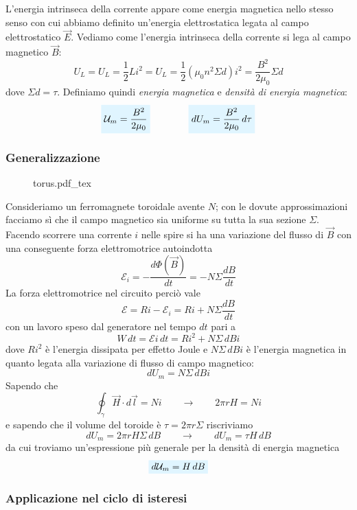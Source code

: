 \documentclass[x11names]{report}
\newcommand{\incfig}[1]{%
	{#1.pdf_tex}
}
\newcommand{\viola}[1]{%
	\colorbox{myblue}{$\displaystyle #1$}
}
\begin{document}
L'energia intrinseca della corrente appare come energia magnetica nello stesso senso con cui abbiamo definito un'energia elettrostatica legata al campo elettrostatico \(\vec{E}\). Vediamo come l'energia intrinseca della corrente si lega al campo magnetico \(\vec{B}\):
\[
U_L = U_L = \frac{1}{2}Li^2 = U_L = \frac{1}{2}\left(\mu_0 n^2 \Sigma d\right)i^2 = \frac{B^2}{2\mu_0}\Sigma d
\]
dove \(\Sigma d = \tau\). Definiamo quindi \textit{energia magnetica} e \textit{densità di energia magnetica}:
\begin{equation}
	 \viola{\mathcal{U}_m = \frac{B^2}{2\mu_0}}\qquad \qquad \viola{dU_m = \frac{B^2}{2\mu_0} \, d\tau} 
\end{equation}


\subsubsection{Generalizzazione}
\begin{figure}
	\incfig{torus}
\end{figure}
Consideriamo un ferromagnete toroidale avente \(N\); con le dovute approssimazioni facciamo sì che il campo magnetico sia uniforme su tutta la sua sezione \(\Sigma\). Facendo scorrere una corrente \(i\) nelle spire si ha una variazione del flusso di \(\vec{B}\) con una conseguente forza elettromotrice autoindotta
\[
\mathcal{E}_i  =- \frac{d\Phi(\vec{B})}{dt} = -N\Sigma \frac{dB}{dt}
\]
La forza elettromotrice nel circuito perciò vale 
\[
\mathcal{E} = Ri - \mathcal{E}_i = Ri + N\Sigma \frac{dB}{dt}
\]
con un lavoro speso dal generatore nel tempo \(dt\) pari a 
\[
W \, dt = \mathcal{E}i \, dt = Ri^2 + N\Sigma \, dB i
\]
dove \(Ri^2\) è l'energia dissipata per effetto Joule e \(N\Sigma \, dB i\) è l'energia magnetica in quanto legata alla variazione di flusso di campo magnetico:
\[
dU_m = N\Sigma \, dB i
\]
Sapendo che
\[
\oint_\gamma \vec{H} \cdot d\vec{l} = Ni \qquad \to \qquad 2\pi r H = Ni 
\]
e sapendo che il volume del toroide è \(\tau = 2\pi r \Sigma\) riscriviamo
\[
dU_m = 2\pi r H \Sigma  \, dB  \qquad \to \qquad dU_m = \tau H \, dB
\]
da cui troviamo un'espressione più generale per la densità di energia magnetica
\begin{equation}
	\viola{d\mathcal{U}_m = H \, dB}
\end{equation}

\subsubsection{Applicazione nel ciclo di isteresi}
\end{document}
